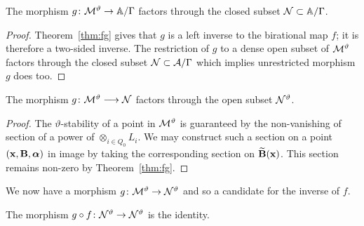 \documentclass{amsart}
\newcommand{\balpha}{\boldsymbol{\alpha}}
\theoremstyle{definition}
\begin{document}
\begin{corollary}
The morphism $g \colon \mathcal{M}^\vartheta \rightarrow \mathbb{A}/\Gamma$ factors through the closed subset $\mathcal{N} \subset \mathbb{A}/\Gamma$.
\end{corollary}

\begin{proof}
Theorem~\ref{thm:fg} gives that $g$ is a left inverse to the birational map $f$; it is therefore a two-sided inverse.
The restriction of $g$ to a dense open subset of $\mathcal{M}^\vartheta$ factors through the closed subset $\mathcal{N} \subset \mathcal{A}/\Gamma$ which implies unrestricted morphism $g$ does too.
\end{proof}

\begin{corollary}
The morphism $g \colon \mathcal{M}^\vartheta \longrightarrow \mathcal{N}$ factors through the open subset $\mathcal{N}^\vartheta$.
\end{corollary}

\begin{proof}
The $\vartheta$-stability of a point in $\mathcal{M}^\vartheta$ is guaranteed by the non-vanishing of section of a power of $\otimes_{i \in Q_0} L_i$.
We may construct such a section on a point $(\bfx, \bfB, \balpha)$ in image by taking the corresponding section on $\widetilde{\mathbf{B}}(\mathbf{x})$.
This section remains non-zero by Theorem~\ref{thm:fg}.
\end{proof}

We now have a morphism $g \colon \mathcal{M}^\vartheta \rightarrow \mathcal{N}^\vartheta$ and so a candidate for the inverse of $f$.

\begin{theorem}\label{thm:ghilb}
The morphism $g \circ f \colon \mathcal{N}^\vartheta \rightarrow \mathcal{N}^\vartheta$ is the identity.
\end{theorem}
\end{document}
